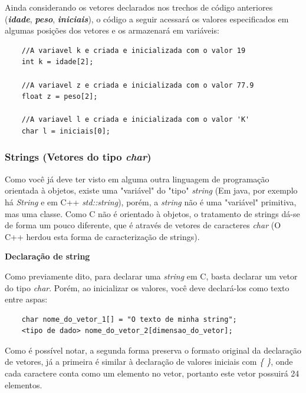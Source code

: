 \documentclass[12pt]{article}
\newcommand\tab[1][1cm]{\hspace*{#1}}
\begin{document}
\par\tab Ainda considerando os vetores declarados nos trechos de código anteriores (\textbf{\textit{idade}}, \textbf{\textit{peso}}, \textbf{\textit{iniciais}}), o código a seguir acessará os valores especificados em algumas posições dos vetores e os armazenará em variáveis:

\hspace{0.25cm}
\begin{lstlisting}
    //A variavel k e criada e inicializada com o valor 19
    int k = idade[2];
    
    //A variavel z e criada e inicializada com o valor 77.9
    float z = peso[2];
    
    //A variavel l e criada e inicializada com o valor 'K'
    char l = iniciais[0];
\end{lstlisting}

\subsubsection{Strings (Vetores do tipo \textit{char})}

\par\tab Como você já deve ter visto em alguma outra linguagem de programação orientada à objetos, existe uma "variável" do "tipo" \textit{string} (Em java, por exemplo há \textit{String} e em C++ \textit{std::string}), porém, a \textit{string} não é uma "variável" primitiva, mas uma classe. Como C não é orientado à objetos, o tratamento de strings dá-se de forma um pouco diferente, que é através de vetores de caracteres \textit{char} (O C++ herdou esta forma de caracterização de strings).

\par\tab \textbf{Declaração de string}

\par\tab Como previamente dito, para declarar uma \textit{string} em C, basta declarar um vetor do tipo \textit{char}. Porém, ao inicializar os valores, você deve declará-los como texto entre aspas:

\hspace{0.25cm}
\begin{lstlisting}
    char nome_do_vetor_1[] = "O texto de minha string";
    <tipo de dado> nome_do_vetor_2[dimensao_do_vetor];
\end{lstlisting}

\par\tab Como é possível notar, a segunda forma preserva o formato original da declaração de vetores, já a primeira é similar à declaração de valores iniciais com \textit{\{ \}}, onde cada caractere conta como um elemento no vetor, portanto este vetor possuirá 24 elementos.
\end{document}
